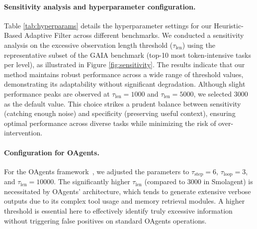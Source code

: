 \paragraph{Sensitivity analysis and hyperparameter configuration.}
Table \ref{tab:hyperparams} details the hyperparameter settings for our Heuristic-Based Adaptive Filter across different benchmarks. We conducted a sensitivity analysis on the excessive observation length threshold ($\tau_{\text{len}}$) using the representative subset of the GAIA benchmark (top-10 most token-intensive tasks per level), as illustrated in Figure \ref{fig:sensitivity}. The results indicate that our method maintains robust performance across a wide range of threshold values, demonstrating its adaptability without significant degradation. Although slight performance peaks are observed at $\tau_{\text{len}}=1000$ and $\tau_{\text{len}}=5000$, we selected $3000$ as the default value. This choice strikes a prudent balance between sensitivity (catching enough noise) and specificity (preserving useful context), ensuring optimal performance across diverse tasks while minimizing the risk of over-intervention.

\paragraph{Configuration for OAgents.}
For the OAgents framework~\citep{zhu2025oagentsempiricalstudybuilding}, we adjusted the parameters to $\tau_{\text{step}}=6$, $\tau_{\text{loop}}=3$, and $\tau_{\text{len}}=10000$. The significantly higher $\tau_{\text{len}}$ (compared to 3000 in Smolagent) is necessitated by OAgents' architecture, which tends to generate extensive verbose outputs due to its complex tool usage and memory retrieval modules. A higher threshold is essential here to effectively identify truly excessive information without triggering false positives on standard OAgents operations.

